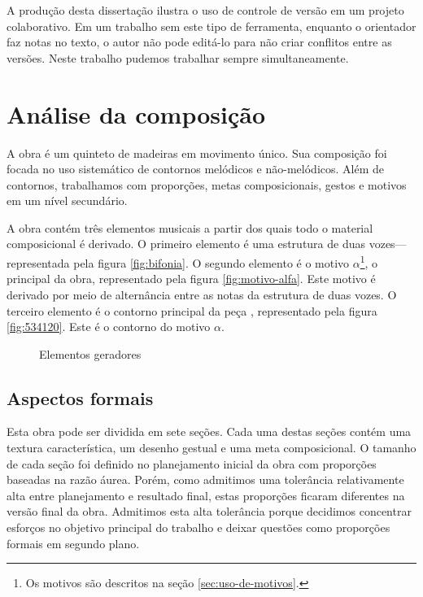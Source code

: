 A produção desta dissertação ilustra o uso de controle de versão em um
projeto colaborativo. Em um trabalho sem este tipo de ferramenta,
enquanto o orientador faz notas no texto, o autor não pode editá-lo
para não criar conflitos entre as versões. Neste trabalho pudemos
trabalhar sempre simultaneamente.


\chapter{Análise da composição}
\label{cha:anal-da-comp}

A obra \obra{} é um quinteto de madeiras em movimento único. Sua
composição foi focada no uso sistemático de contornos melódicos e
não-melódicos. Além de contornos, trabalhamos com proporções, metas
composicionais, gestos e motivos em um nível secundário.

A obra contém três elementos musicais a partir dos quais todo o
material composicional é derivado. O primeiro elemento é uma estrutura
de duas vozes---representada pela figura \ref{fig:bifonia}. O segundo
elemento é o motivo $\alpha$\footnote{Os motivos são descritos na
  seção \ref{sec:uso-de-motivos}.}, o principal da obra, representado
pela figura \ref{fig:motivo-alfa}. Este motivo é derivado por meio de
alternância entre as notas da estrutura de duas vozes. O terceiro
elemento é o contorno principal da peça \contpr{}, representado pela
figura \ref{fig:534120}. Este é o contorno do motivo $\alpha$.

\begin{figure}
  \centering

  \caption{Elementos geradores}
  \label{fig:elementos-geradores}
\end{figure}

\section{Aspectos formais}
\label{sec:aspectos-formais}

Esta obra pode ser dividida em sete seções. Cada uma destas seções
contém uma textura característica, um desenho gestual e uma meta
composicional.
O tamanho de cada seção foi definido no planejamento inicial da obra
com proporções baseadas na razão áurea.
Porém, como admitimos uma tolerância relativamente alta entre
planejamento e resultado final, estas proporções ficaram diferentes na
versão final da obra.
Admitimos esta alta tolerância porque decidimos concentrar esforços no
objetivo principal do trabalho e deixar questões como proporções
formais em segundo plano.

